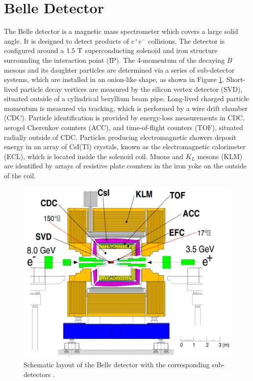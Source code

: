 \section{Belle Detector}
The Belle detector is a magnetic mass spectrometer which covers a large solid angle. It is designed to detect products of $e^+e^-$ collisions. The detector is configured around a $1.5\mathrm{~T}$ superconducting solenoid and iron structure surrounding the interaction point (IP). The 4-momentum of the decaying $B$ mesons and its daughter particles are determined via a series of sub-detector systems, which are installed in an onion-like shape, as shown in Figure \ref{fig:bdet}. Short-lived particle decay vertices are measured by the silicon vertex detector (SVD), situated outside of a cylindrical beryllium beam pipe. Long-lived charged particle momentum is measured via tracking, which is performed by a wire drift chamber (CDC). Particle identification is provided by energy-loss measurements in CDC, aerogel Cherenkov counters (ACC), and time-of-flight counters (TOF), situated radially outside of CDC. Particles producing electromagnetic showers deposit energy in an array of CsI(Tl) crystals, known as the electromagnetic calorimeter (ECL), which is located inside the solenoid coil. Muons and $K_L$ mesons (KLM) are identified by arrays of resistive plate counters in the iron yoke on the outside of the coil. 

\begin{figure}[H]
	\centering
	\captionsetup{width=0.8\linewidth}
	\includegraphics[width=0.8\linewidth]{fig/setup/Belle_detector}
	\caption{Schematic layout of the Belle detector with the corresponding sub-detectors \cite{ABASHIAN2002117}.}
	\label{fig:bdet}
\end{figure}


